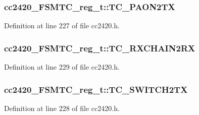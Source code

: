 \subsubsection[{\texorpdfstring{T\+C\+\_\+\+P\+A\+O\+N2\+TX}{TC_PAON2TX}}]{ cc2420\+\_\+\+F\+S\+M\+T\+C\+\_\+reg\+\_\+t\+::\+T\+C\+\_\+\+P\+A\+O\+N2\+TX}\hypertarget{structcc2420___f_s_m_t_c__reg__t_ae64a1c3bbd928b074ebe366df36182e5}{}\label{structcc2420___f_s_m_t_c__reg__t_ae64a1c3bbd928b074ebe366df36182e5}


Definition at line 227 of file cc2420.\+h.

\subsubsection[{\texorpdfstring{T\+C\+\_\+\+R\+X\+C\+H\+A\+I\+N2\+RX}{TC_RXCHAIN2RX}}]{ cc2420\+\_\+\+F\+S\+M\+T\+C\+\_\+reg\+\_\+t\+::\+T\+C\+\_\+\+R\+X\+C\+H\+A\+I\+N2\+RX}\hypertarget{structcc2420___f_s_m_t_c__reg__t_a748f8ce4e525a402d91e97260c67a2ae}{}\label{structcc2420___f_s_m_t_c__reg__t_a748f8ce4e525a402d91e97260c67a2ae}


Definition at line 229 of file cc2420.\+h.

\subsubsection[{\texorpdfstring{T\+C\+\_\+\+S\+W\+I\+T\+C\+H2\+TX}{TC_SWITCH2TX}}]{ cc2420\+\_\+\+F\+S\+M\+T\+C\+\_\+reg\+\_\+t\+::\+T\+C\+\_\+\+S\+W\+I\+T\+C\+H2\+TX}\hypertarget{structcc2420___f_s_m_t_c__reg__t_ade4ce3d589eb827c2de8ade5b7556e23}{}\label{structcc2420___f_s_m_t_c__reg__t_ade4ce3d589eb827c2de8ade5b7556e23}


Definition at line 228 of file cc2420.\+h.

